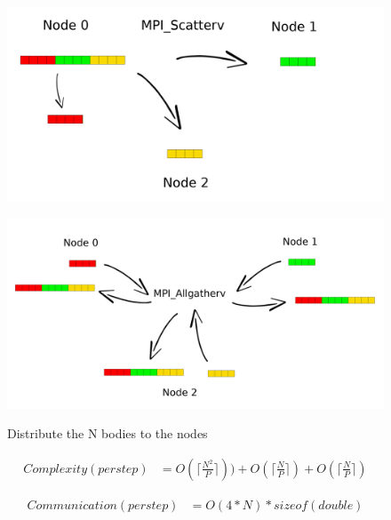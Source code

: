\documentclass[a4paper]{article}
\begin{document}
\begin{figure}[ht]
\centering
\begin{minipage}{.5\textwidth}
  \centering
  \includegraphics[width=\linewidth]{scatter}
  \caption{Distribute the N bodies to the nodes}
  \label{fig:sca}
\end{minipage}%
\begin{minipage}{.5\textwidth}
  \centering
  \includegraphics[width=\linewidth]{MPI_all_gather}
  \label{fig:posi}
\end{minipage}
\end{figure}
\FloatBarrier



\begin{equation} \label{eq:comp_app2}
\begin{split}
Complexity (per step) & = O(\lceil\frac{N^2}{P}\rceil)) + O(\lceil\frac{N}{P}\rceil) + O(\lceil\frac{N}{P}\rceil)
\end{split}
\end{equation}

\begin{equation} \label{eq:com_app2}
\begin{split}
Communication (per step) & = O(4*N)*sizeof(double)
\end{split}
\end{equation}
\end{document}
